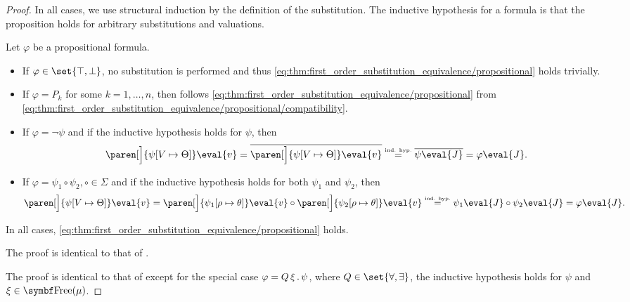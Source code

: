 \begin{proof}
  In all cases, we use structural induction by the definition of the substitution\IND. The inductive hypothesis for a formula is that the proposition holds for arbitrary substitutions and valuations.

   Let \( \varphi \) be a propositional formula.
  \begin{itemize}
    \item If \( \varphi \in \set{ \top, \bot } \), no substitution is performed and thus \eqref{eq:thm:first_order_substitution_equivalence/propositional} holds trivially.

    \item If \( \varphi = P_k \) for some \( k = 1, \ldots, n \), then follows \eqref{eq:thm:first_order_substitution_equivalence/propositional} from \eqref{eq:thm:first_order_substitution_equivalence/propositional/compatibility}.

    \item If \( \varphi = \neg \psi \) and if the inductive hypothesis holds for \( \psi \), then
    \begin{equation*}
      \paren[\Big]{ \psi[V \mapsto \Theta] }\eval{v}
      =
      \overline{\paren[\Big]{ \psi[V \mapsto \Theta] }\eval{v}}
      \overset {\IndHyp} =
      \overline{\psi \eval{J}}
      =
      \varphi \eval{J}.
    \end{equation*}

    \item If \( \varphi = \psi_1 \circ \psi_2, \circ \in \Sigma \) and if the inductive hypothesis holds for both \( \psi_1 \) and \( \psi_2 \), then
    \begin{equation*}
      \paren[\Big]{ \psi[V \mapsto \Theta] }\eval{v}
      =
      \paren[\Big]{ \psi_1[\rho \mapsto \theta] }\eval{v} \circ \paren[\Big]{ \psi_2[\rho \mapsto \theta] }\eval{v}
      \overset {\IndHyp} =
      \psi_1 \eval{J} \circ \psi_2\eval{J}
      =
      \varphi\eval{J}.
    \end{equation*}
  \end{itemize}

  In all cases, \eqref{eq:thm:first_order_substitution_equivalence/propositional} holds.

   The proof is identical to that of .

   The proof is identical to that of  except for the special case \( \varphi = Q \, \xi \, . \, \psi \), where \( Q \in \set{ \forall, \exists } \), the inductive hypothesis holds for \( \psi \) and \( \xi \in \bfop{Free}(\mu) \).


\end{proof}
